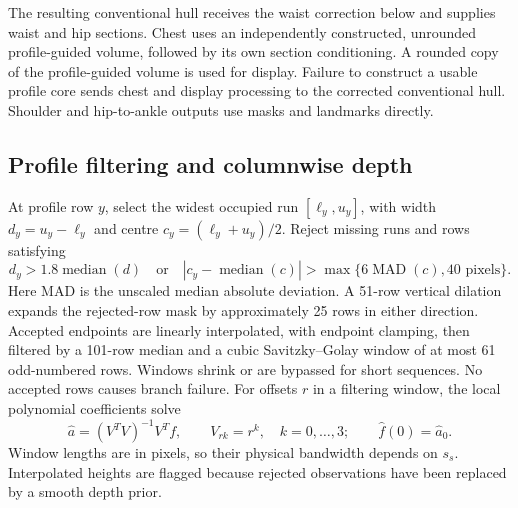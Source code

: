 \documentclass[11pt,a4paper]{article}
\begin{document}
The resulting conventional hull receives the waist correction below and supplies waist and hip sections. Chest uses an independently constructed, unrounded profile-guided volume, followed by its own section conditioning. A rounded copy of the profile-guided volume is used for display. Failure to construct a usable profile core sends chest and display processing to the corrected conventional hull. Shoulder and hip-to-ankle outputs use masks and landmarks directly.

\subsection{Profile filtering and columnwise depth}
At profile row $y$, select the widest occupied run $[\ell_y,u_y]$, with width $d_y=u_y-\ell_y$ and centre $c_y=(\ell_y+u_y)/2$. Reject missing runs and rows satisfying
\begin{equation}
 d_y>1.8\operatorname{median}(d)\quad\text{or}\quad
 |c_y-\operatorname{median}(c)|>
 \max\{6\operatorname{MAD}(c),40\text{ pixels}\}.
\end{equation}
Here MAD is the unscaled median absolute deviation. A 51-row vertical dilation expands the rejected-row mask by approximately 25 rows in either direction. Accepted endpoints are linearly interpolated, with endpoint clamping, then filtered by a 101-row median and a cubic Savitzky--Golay window of at most 61 odd-numbered rows. Windows shrink or are bypassed for short sequences. No accepted rows causes branch failure. For offsets $r$ in a filtering window, the local polynomial coefficients solve
\begin{equation}
 \hat a=(V^TV)^{-1}V^Tf,\qquad V_{rk}=r^k,\quad k=0,\ldots,3;
 \qquad \hat f(0)=\hat a_0.
\end{equation}
Window lengths are in pixels, so their physical bandwidth depends on $s_s$. Interpolated heights are flagged because rejected observations have been replaced by a smooth depth prior.
\end{document}
